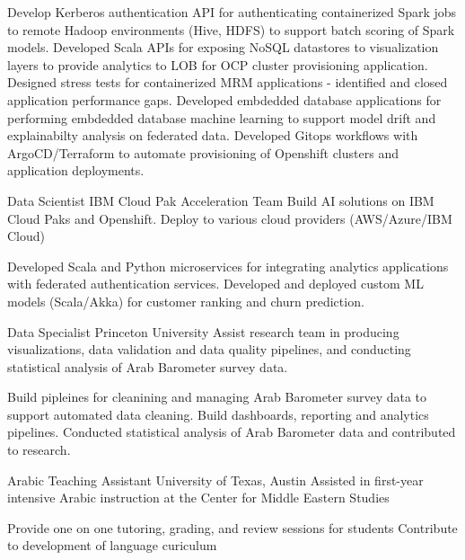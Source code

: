 \documentclass[a4paper]{Resume}
\begin{document}
{Develop Kerberos authentication API for authenticating containerized Spark jobs to remote Hadoop environments (Hive, HDFS) to support batch scoring of Spark models.}
{Developed Scala APIs for exposing NoSQL datastores to visualization layers to provide analytics to LOB for OCP cluster provisioning application.}
{Designed stress tests for containerized MRM applications - identified and closed application performance gaps.}
{Developed embdedded database applications for performing embdedded database machine learning to support model drift and explainabilty analysis on federated data.}
{Developed Gitops workflows with ArgoCD/Terraform to automate provisioning of Openshift clusters and application deployments.}


{Data Scientist}
{IBM Cloud Pak Acceleration Team}
{Build AI solutions on IBM Cloud Paks and Openshift. Deploy to various cloud providers (AWS/Azure/IBM Cloud)}

{Developed Scala and Python microservices for integrating analytics applications with federated authentication services.}
{Developed and deployed custom ML models (Scala/Akka) for customer ranking and churn prediction.}


{Data Specialist}
{Princeton University}
{Assist research team in producing visualizations, data validation and data quality pipelines, and conducting statistical analysis of Arab Barometer survey data.}

{Build pipleines for cleanining and managing Arab Barometer survey data to support automated data cleaning.}
{Build dashboards, reporting and analytics pipelines. Conducted statistical analysis of Arab Barometer data and contributed to research.}



{Arabic Teaching Assistant}
{University of Texas, Austin}
{Assisted in first-year intensive Arabic instruction at the Center for Middle Eastern Studies}

{Provide one on one tutoring, grading, and review sessions for students }
{Contribute to development of language curiculum}
\end{document}
